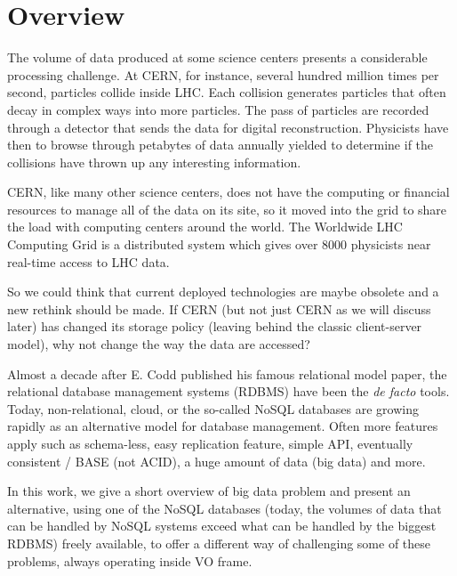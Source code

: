 \chapter{Overview}


The volume of data produced at some science centers presents a considerable processing challenge. At CERN, for instance, several hundred million times per second, particles collide inside LHC. Each collision generates particles that often decay in complex ways into more particles. The pass of particles are recorded through a detector that sends the data for digital reconstruction. Physicists have then to browse through petabytes of data annually yielded to determine if the collisions have thrown up any interesting information. \newline

CERN, like many other science centers, does not have the computing or financial resources to manage all of the data on its site, so it moved into the grid to share the load with computing centers around the world. The Worldwide LHC Computing Grid is a distributed system which gives over 8000 physicists near real-time access to LHC data.  \newline

So we could think that current deployed technologies are maybe obsolete and a new rethink should be made. If CERN (but not just CERN as we will discuss later) has changed its storage policy (leaving behind the classic client-server model), why not change the way the data are accessed?  \newline

Almost a decade after E. Codd published his famous relational model paper, the relational database management systems (RDBMS) have been the \textit{de facto} tools. Today, non-relational, cloud, or the so-called NoSQL databases are growing rapidly as an alternative model for database management. Often more features apply such as schema-less, easy replication feature, simple API, eventually consistent / BASE (not ACID), a huge amount of data (big data) and more. \newline

In this work, we give a short overview of big data problem and present an alternative, using one of the NoSQL databases (today, the volumes of data that can be handled by NoSQL systems exceed what can be handled by the biggest RDBMS) freely available, to offer a different way of challenging some of these problems, always operating inside VO frame.
